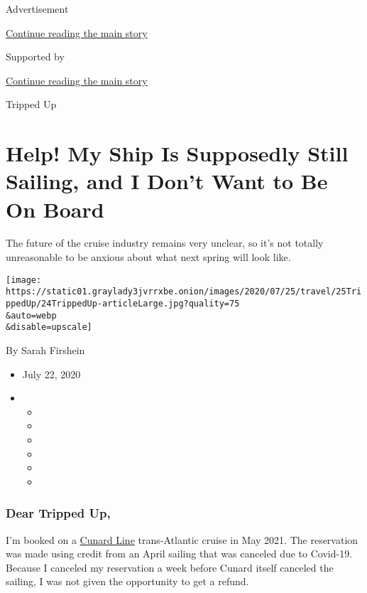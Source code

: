 Advertisement

\protect\hyperlink{after-top}{Continue reading the main story}

Supported by

\protect\hyperlink{after-sponsor}{Continue reading the main story}

Tripped Up

\hypertarget{help-my-ship-is-supposedly-still-sailing-and-i-dont-want-to-be-on-board}{%
\section{Help! My Ship Is Supposedly Still Sailing, and I Don't Want to
Be On
Board}\label{help-my-ship-is-supposedly-still-sailing-and-i-dont-want-to-be-on-board}}

The future of the cruise industry remains very unclear, so it's not
totally unreasonable to be anxious about what next spring will look
like.

\texttt{[image: https://static01.graylady3jvrrxbe.onion/images/2020/07/25/travel/25TrippedUp/24TrippedUp-articleLarge.jpg?quality=75\\\&auto=webp\\\&disable=upscale]}

By Sarah Firshein

\begin{itemize}
\item
  July 22, 2020
\item
  \begin{itemize}
  \item
  \item
  \item
  \item
  \item
  \item
  \end{itemize}
\end{itemize}

\hypertarget{dear-tripped-up}{%
\subsubsection{\texorpdfstring{\textbf{Dear Tripped
Up,}}{Dear Tripped Up,}}\label{dear-tripped-up}}

I'm booked on a \href{https://www.cunard.com/en-us}{Cunard Line}
trans-Atlantic cruise in May 2021. The reservation was made using credit
from an April sailing that was canceled due to Covid-19. Because I
canceled my reservation a week before Cunard itself canceled the
sailing, I was not given the opportunity to get a refund.

